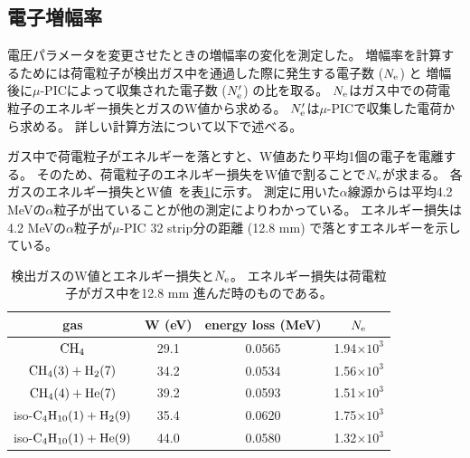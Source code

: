 \documentclass[../master]{subfiles}
\begin{document}
\subsection{電子増幅率}
電圧パラメータを変更させたときの増幅率の変化を測定した。
増幅率を計算するためには荷電粒子が検出ガス中を通過した際に発生する電子数 ($N_{\rm e}$) と
増幅後に$\mu$-PICによって収集された電子数 ($N'_{\rm e}$) の比を取る。
$N_{\rm e}$はガス中での荷電粒子のエネルギー損失とガスのW値から求める。
$N'_{\rm e}$は$\mu$-PICで収集した電荷から求める。
詳しい計算方法について以下で述べる。

ガス中で荷電粒子がエネルギーを落とすと、W値あたり平均1個の電子を電離する。
そのため、荷電粒子のエネルギー損失をW値で割ることで$N_{\rm e}$が求まる。
各ガスのエネルギー損失とW値~\cite{energy_per_ion_pair,pdg}を表\ref{tab::energy_loss_and_W_val}に示す。
測定に用いた$\alpha$線源からは平均4.2 MeVの$\alpha$粒子が出ていることが他の測定によりわかっている。
エネルギー損失は4.2 MeVの$\alpha$粒子が$\mu$-PIC 32 strip分の距離 (12.8 mm) で落とすエネルギーを示している。
\begin{table}
  \centering
  \caption[検出ガスのW値とエネルギー損失と$N_{\rm e}$。]
          {検出ガスのW値とエネルギー損失と$N_{\rm e}$。
          エネルギー損失は荷電粒子がガス中を12.8 mm 進んだ時のものである。}
  \label{tab::energy_loss_and_W_val}
  \begin{tabular}{cccc}
    \toprule
    gas & W (eV) & energy loss (MeV) & $N_{\rm e}$\\
    \midrule
    ${\rm CH_{4}}$                          & 29.1 & 0.0565 & 1.94$\times 10^{3}$ \\
    ${\rm CH_{4} (3) + H_{2} (7)}$          & 34.2 & 0.0534 & 1.56$\times 10^{3}$ \\
    ${\rm CH_{4} (4) + He (7)}$             & 39.2 & 0.0593 & 1.51$\times 10^{3}$ \\
    iso-${\rm C_{4}H_{10} (1) + H_{2} (9)}$ & 35.4 & 0.0620 & 1.75$\times 10^{3}$ \\
    iso-${\rm C_{4}H_{10} (1) + He (9)}$    & 44.0 & 0.0580 & 1.32$\times 10^{3}$ \\
    \bottomrule
  \end{tabular}
\end{table}
\end{document}
